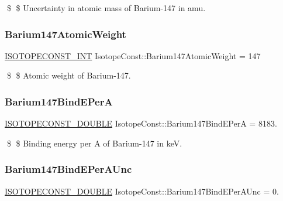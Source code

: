\$ \$ Uncertainty in atomic mass of Barium-\/147 in amu. \mbox{\label{group___isotope_const-_barium-_ba147_gaeeda4ff9b8938cffa6d3bdeee7ea3072}} 
\subsubsection{\texorpdfstring{Barium147\+Atomic\+Weight}{Barium147AtomicWeight}}
{\footnotesize\ttfamily \mbox{\hyperlink{group___isotope_const-_macros_ga5f18360b3e99483a35c32d789e62621c}{I\+S\+O\+T\+O\+P\+E\+C\+O\+N\+S\+T\+\_\+\+I\+NT}} Isotope\+Const\+::\+Barium147\+Atomic\+Weight = 147}

\$ \$ Atomic weight of Barium-\/147. \mbox{\label{group___isotope_const-_barium-_ba147_ga5a1aaef71f0f1d893b67e4dc2717eb6b}} 
\subsubsection{\texorpdfstring{Barium147\+Bind\+E\+PerA}{Barium147BindEPerA}}
{\footnotesize\ttfamily \mbox{\hyperlink{group___isotope_const-_macros_ga8f45a7272ce02c0b4c65c44636ed719a}{I\+S\+O\+T\+O\+P\+E\+C\+O\+N\+S\+T\+\_\+\+D\+O\+U\+B\+LE}} Isotope\+Const\+::\+Barium147\+Bind\+E\+PerA = 8183.}

\$ \$ Binding energy per A of Barium-\/147 in keV. \mbox{\label{group___isotope_const-_barium-_ba147_ga2a6888f04ff0870d7702f92bbd297fbc}} 
\subsubsection{\texorpdfstring{Barium147\+Bind\+E\+Per\+A\+Unc}{Barium147BindEPerAUnc}}
{\footnotesize\ttfamily \mbox{\hyperlink{group___isotope_const-_macros_ga8f45a7272ce02c0b4c65c44636ed719a}{I\+S\+O\+T\+O\+P\+E\+C\+O\+N\+S\+T\+\_\+\+D\+O\+U\+B\+LE}} Isotope\+Const\+::\+Barium147\+Bind\+E\+Per\+A\+Unc = 0.}

